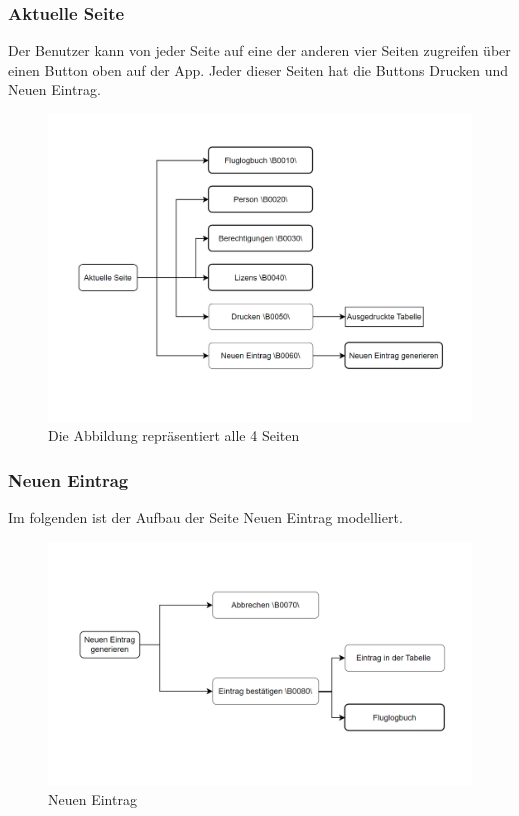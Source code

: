 \documentclass[a4paper]{article} %
\begin{document}
    \subsubsection{Aktuelle Seite}
    Der Benutzer kann von jeder Seite auf eine der anderen vier Seiten zugreifen über einen Button oben auf der App. Jeder dieser Seiten hat die Buttons \glqq{}Drucken\grqq{} und \glqq{}Neuen Eintrag\grqq{}.
    \begin{figure}[h!]
        \centering
        \includegraphics{Benutzeroberflaeche_Floglogbuch.png}
        \caption{Die Abbildung repräsentiert alle 4 Seiten}
        \label{fig:my_label}
    \end{figure}
    \pagebreak
    \subsubsection{Neuen Eintrag}
    \vspace{0.5cm}
    Im folgenden ist der Aufbau der Seite \glqq{}Neuen Eintrag\grqq{} modelliert.
    \begin{figure}[h!]
        \centering
        \includegraphics{Benutzeroberflaeche_Neuer_Eintrag.png}
        \caption{Neuen Eintrag}
        \label{fig:my_label}
    \end{figure}
    \vspace{0.5cm}
\end{document}
